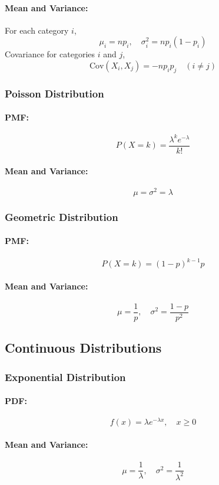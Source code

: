 \documentclass[8pt, a4paper, landscape, includeheadfoot]{extarticle}
\begin{document}
\begin{multicols*}{4}
	\paragraph{Mean and Variance:}
	For each category $i$,
	$$
		\mu_i = np_i, \quad \sigma^2_i = np_i(1 - p_i)
	$$
	Covariance for categories $i$ and $j$,
	$$
		\mathrm{Cov}(X_i, X_j) = -np_i p_j \quad (i \neq j)
	$$

	\subsubsection{Poisson Distribution}{}
	\paragraph{PMF:}
	$$
		P(X = k) = \frac{\lambda^k e^{-\lambda}}{k!}
	$$
	\paragraph{Mean and Variance:}
	$$
		\mu = \sigma^2 = \lambda
	$$

	\subsubsection{Geometric Distribution}{}
	\paragraph{PMF:}
	$$
		P(X = k) = (1-p)^{k-1} p
	$$
	\paragraph{Mean and Variance:}
	$$
		\mu = \frac{1}{p}, \quad \sigma^2 = \frac{1 - p}{p^2}
	$$

	\subsection{Continuous Distributions}

	\subsubsection{Exponential Distribution}{}
	\paragraph{PDF:}
	$$
		f(x) = \lambda e^{-\lambda x}, \quad x \geq 0
	$$
	\paragraph{Mean and Variance:}
	$$
		\mu = \frac{1}{\lambda}, \quad \sigma^2 = \frac{1}{\lambda^2}
	$$


\end{multicols*}
\end{document}
